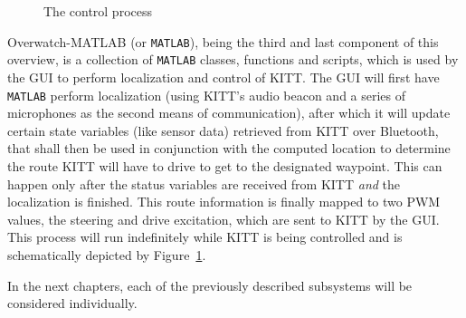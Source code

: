 \documentclass[11pt,titlepage]{report}
\begin{document}
\begin{figure}[H]
	\centering
	
	\caption{The control process}
	\label{fig:system-overview-process}
\end{figure}

Overwatch-MATLAB (or \texttt{MATLAB}), being the third and last component of this overview, is a collection of \texttt{MATLAB} classes, functions and scripts, which is used by the GUI to perform localization and control of KITT. The GUI will first have \texttt{MATLAB} perform localization (using KITT's audio beacon and a series of microphones as the second means of communication), after which it will update certain state variables (like sensor data) retrieved from KITT over Bluetooth, that shall then be used in conjunction with the computed location to determine the route KITT will have to drive to get to the designated waypoint. This can happen only after the status variables are received from KITT \emph{and} the localization is finished. This route information is finally mapped to two PWM values, the steering and drive excitation, which are sent to KITT by the GUI.
This process will run indefinitely while KITT is being controlled and is schematically depicted by Figure~\ref{fig:system-overview-process}.

In the next chapters, each of the previously described subsystems will be considered individually.
\end{document}
